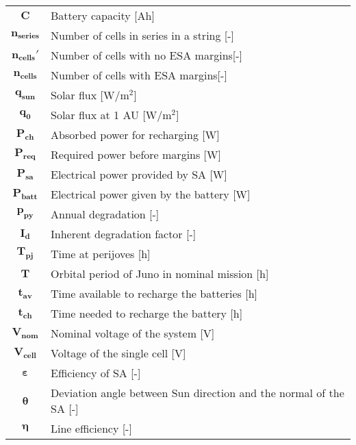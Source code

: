 \begin{multicols}{2}
{\begin{xltabular}{\linewidth}{c>{\raggedright\arraybackslash}X}
		$\boldsymbol{C}$ & Battery capacity [Ah] \\
		$\boldsymbol{n_{series}}$ & Number of cells in series in a string [-] \\
		$\boldsymbol{n_{cells}'}$ & Number of cells with no ESA margins[-] \\
		$\boldsymbol{n_{cells}}$ & Number of cells with ESA margins[-] \\
		$\boldsymbol{q_{sun}}$ & Solar flux [W/$\textrm{m}^2$] \\
		$\boldsymbol{q_{0}}$ & Solar flux at 1 AU [W/$\textrm{m}^2$] \\
		$\boldsymbol{P_{ch}}$ & Absorbed power for recharging [W] \\
		$\boldsymbol{P_{req}}$ & Required power before margins [W] \\
		$\boldsymbol{P_{sa}}$ & Electrical power provided by SA [W] \\
		$\boldsymbol{P_{batt}}$ & Electrical power given by the battery [W] \\
		$\boldsymbol{p_{py}}$ & Annual degradation [-] \\
		$\boldsymbol{I_{d}}$ & Inherent degradation factor [-] \\
		$\boldsymbol{T_{pj}}$ & Time at perijoves [h] \\
		$\boldsymbol{T}$ & Orbital period of Juno in nominal mission [h] \\
		$\boldsymbol{t_{av}}$ & Time available to recharge the batteries [h] \\
		$\boldsymbol{t_{ch}}$ & Time needed to recharge the battery [h] \\
		$\boldsymbol{V_{nom}}$ & Nominal voltage of the system [V] \\
		$\boldsymbol{V_{cell}}$ & Voltage of the single cell [V] \\
		$\boldsymbol{\varepsilon}$ & Efficiency of SA [-] \\
		$\boldsymbol{\theta}$ & Deviation angle between Sun direction and the normal of the SA  [-] \\
		$\boldsymbol{\eta}$ &  Line efficiency [-] 
 	\end{xltabular}
	\unskip
	\unpenalty
	\unpenalty}
	\unvbox\ltmcbox
\end{multicols}